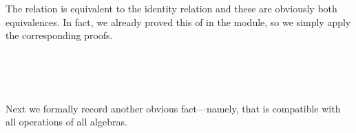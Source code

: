 The relation  is equivalent to the identity relation  and these are obviously both equivalences. In fact, we already proved this of  in the \ualibEquality module, so we simply apply the corresponding proofs.
\ccpad
\begin{code}%
\>[0]\AgdaSpace{}%
\AgdaModule{\AgdaUnderscore{}}\AgdaSpace{}%
\AgdaSymbol{\{}\AgdaSpace{}%
\AgdaSymbol{:}\AgdaSpace{}%
\AgdaSymbol{\}}\AgdaSpace{}%
\<%
\\
%
\\[\AgdaEmptyExtraSkip]%
\>[0][@{}l@{\AgdaIndent{0}}]%
\>[1]\AgdaSpace{}%
\AgdaSymbol{:}\AgdaSpace{}%
\AgdaSymbol{\{}\AgdaSpace{}%
\AgdaSymbol{:}\AgdaSpace{}%
\AgdaSpace{}%
\AgdaSpace{}%
\AgdaSymbol{\}}\AgdaSpace{}%
\AgdaSpace{}%
\AgdaSymbol{\{}\AgdaSymbol{\}\{}\AgdaSpace{}%
\AgdaSymbol{=}\AgdaSpace{}%
\AgdaSymbol{\}}\AgdaSpace{}%
\<%
\\
%
\>[1]\AgdaSpace{}%
\AgdaSymbol{=}\AgdaSpace{}%
\AgdaSpace{}%
\AgdaSymbol{\{}\AgdaSpace{}%
\AgdaSpace{}%
\AgdaSymbol{=}\AgdaSpace{}%
\AgdaSymbol{;}\AgdaSpace{}%
\AgdaSpace{}%
\AgdaSymbol{=}\AgdaSpace{}%
\AgdaSymbol{;}\AgdaSpace{}%
\AgdaSpace{}%
\AgdaSymbol{=}\AgdaSpace{}%
\AgdaSpace{}%
\AgdaSymbol{\}}\<%
\end{code}
\ccpad
Next we formally record another obvious fact---namely, that  is compatible with all operations of all algebras.
\ccpad
